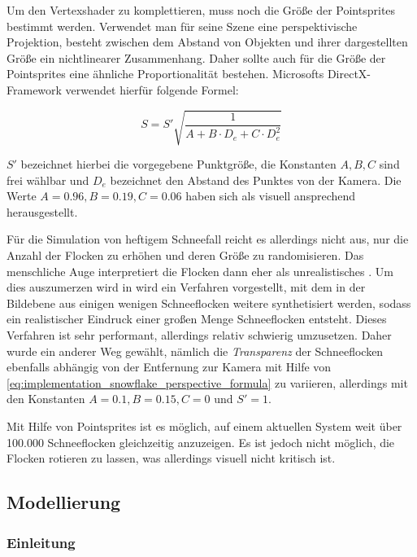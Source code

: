Um den Vertexshader zu komplettieren, muss noch die Größe der
Pointsprites bestimmt werden. Verwendet man für seine Szene eine
perspektivische Projektion, besteht zwischen dem Abstand von Objekten
und ihrer dargestellten Größe ein nichtlinearer Zusammenhang. Daher
sollte auch für die Größe der Pointsprites eine ähnliche
Proportionalität bestehen. Microsofts DirectX-Framework verwendet
hierfür folgende
Formel\cite{DirectXPointSprites}:

\begin{equation}
\label{eq:implementation_snowflake_perspective_formula}
S =
S'
\sqrt{
  \frac
  {
    1
  }
  {
    A +
    B \cdot D_e +
    C \cdot D_e^2
  }
}
\end{equation}

$S'$ bezeichnet hierbei die vorgegebene Punktgröße, die Konstanten
$A,B,C$ sind frei wählbar und $D_e$ bezeichnet den Abstand des Punktes
von der Kamera. Die Werte $A=0.96,B=0.19,C=0.06$ haben sich als
visuell ansprechend herausgestellt.

Für die Simulation von heftigem Schneefall reicht es allerdings nicht
aus, nur die Anzahl der Flocken zu erhöhen und deren Größe zu
randomisieren. Das menschliche Auge interpretiert die Flocken dann
eher als unrealistisches . Um dies auszumerzen
wird in \cite{Langer2004} wird ein Verfahren vorgestellt, mit dem in
der Bildebene aus einigen wenigen Schneeflocken weitere synthetisiert
werden, sodass ein realistischer Eindruck einer großen Menge
Schneeflocken entsteht. Dieses Verfahren ist sehr performant,
allerdings relativ schwierig umzusetzen. Daher wurde ein anderer Weg
gewählt, nämlich die \emph{Transparenz} der Schneeflocken ebenfalls
abhängig von der Entfernung zur Kamera mit Hilfe von
\autoref{eq:implementation_snowflake_perspective_formula} zu
variieren, allerdings mit den Konstanten $A=0.1,B=0.15,C=0$ und
$S'=1$.

Mit Hilfe von Pointsprites ist es möglich, auf einem aktuellen System
weit über 100.000 Schneeflocken gleichzeitig anzuzeigen. Es ist jedoch
nicht möglich, die Flocken rotieren zu lassen, was allerdings visuell
nicht kritisch ist.

\subsection{Modellierung}

\subsubsection{Einleitung}

